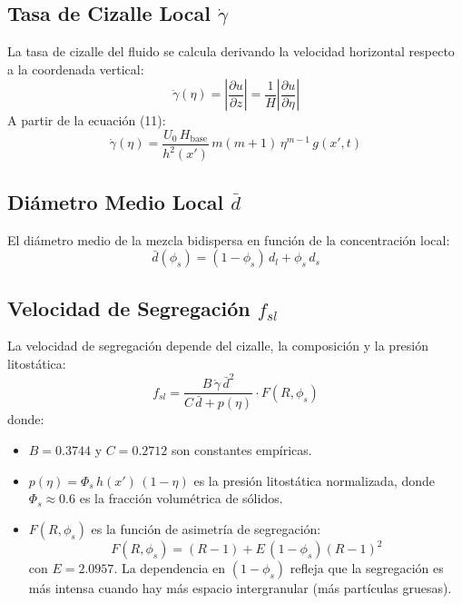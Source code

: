 \documentclass[11pt,a4paper]{article}
\begin{document}
\subsection{Tasa de Cizalle Local $\dot{\gamma}$}
La tasa de cizalle del fluido se calcula derivando la velocidad horizontal respecto a la coordenada vertical:
\begin{equation}
    \dot{\gamma}(\eta) = \left|\frac{\partial u}{\partial z}\right| = \frac{1}{H}\left|\frac{\partial u}{\partial \eta}\right|
\end{equation}
A partir de la ecuación (11):
\begin{equation}
    \dot{\gamma}(\eta) = \frac{U_0 \, H_{\text{base}}}{h^2(x')} \, m(m+1) \, \eta^{m-1} \, g(x', t)
\end{equation}

\subsection{Diámetro Medio Local $\bar{d}$}
El diámetro medio de la mezcla bidispersa en función de la concentración local:
\begin{equation}
    \bar{d}(\phi_s) = (1 - \phi_s) \, d_l + \phi_s \, d_s
\end{equation}

\subsection{Velocidad de Segregación $f_{sl}$}
La velocidad de segregación depende del cizalle, la composición y la presión litostática:
\begin{equation}
    f_{sl} = \frac{B \, \dot{\gamma} \, \bar{d}^2}{C \, \bar{d} + p(\eta)} \cdot F(R, \phi_s)
\end{equation}
donde:
\begin{itemize}
    \item $B = 0.3744$ y $C = 0.2712$ son constantes empíricas.
    \item $p(\eta) = \Phi_s \, h(x') \, (1 - \eta)$ es la presión litostática normalizada, donde $\Phi_s \approx 0.6$ es la fracción volumétrica de sólidos.
    \item $F(R, \phi_s)$ es la función de asimetría de segregación:
    \begin{equation}
        F(R, \phi_s) = (R - 1) + E \, (1 - \phi_s)(R - 1)^2
    \end{equation}
    con $E = 2.0957$. La dependencia en $(1 - \phi_s)$ refleja que la segregación es más intensa cuando hay más espacio intergranular (más partículas gruesas).
\end{itemize}
\end{document}
